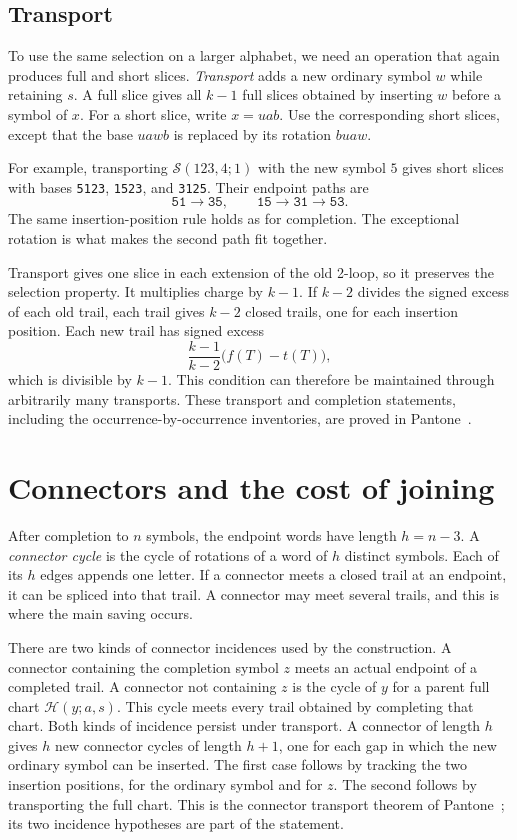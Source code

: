 \documentclass[11pt]{article}
\newcommand{\Slice}{\mathcal S}
\newcommand{\Chart}{\mathcal H}
\newcommand{\word}[1]{\texttt{#1}}
\begin{document}
\subsection{Transport}

To use the same selection on a larger alphabet, we need an operation
that again produces full and short slices. \emph{Transport} adds a new
ordinary symbol $w$ while retaining $s$. A full slice gives all $k-1$
full slices obtained by inserting $w$ before a symbol of $x$. For a short
slice, write $x=uab$. Use the corresponding short slices, except that
the base $uawb$ is replaced by its rotation $buaw$.

For example, transporting $\Slice(123,4;1)$ with the new symbol $5$
gives short slices with bases \word{5123}, \word{1523}, and \word{3125}.
Their endpoint paths are
\[
 \word{51}\longrightarrow\word{35},\qquad
 \word{15}\longrightarrow\word{31}\longrightarrow\word{53}.
\]
The same insertion-position rule holds as for completion. The exceptional
rotation is what makes the second path fit together.

Transport gives one slice in each extension of the old 2-loop, so it
preserves the selection property. It multiplies charge by $k-1$.
If $k-2$ divides the signed excess of each old trail, each trail gives
$k-2$ closed trails, one for each insertion position. Each new trail has
signed excess
\begin{equation}\label{eq-excess}
 \frac{k-1}{k-2}\bigl(f(T)-t(T)\bigr),
\end{equation}
which is divisible by $k-1$. This condition can therefore be maintained
through arbitrarily many transports. These transport and completion
statements, including the occurrence-by-occurrence inventories, are
proved in Pantone~\cite{pantone}.

\section{Connectors and the cost of joining}\label{sec-join}

After completion to $n$ symbols, the endpoint words have length
$h=n-3$. A \emph{connector cycle} is the cycle of rotations of a word
of $h$ distinct symbols. Each of its $h$ edges appends one letter. If
a connector meets a closed trail at an endpoint, it can be spliced into
that trail. A connector may meet several trails, and this is where the
main saving occurs.

There are two kinds of connector incidences used by the construction.
A connector containing the completion symbol $z$ meets an actual endpoint
of a completed trail. A connector not containing $z$ is the cycle of
$y$ for a parent full chart $\Chart(y;a,s)$. This cycle meets every trail
obtained by completing that chart. Both kinds of incidence persist under
transport. A connector of length $h$ gives $h$ new connector cycles of
length $h+1$, one for each gap in which the new ordinary symbol can be
inserted. The first case follows by tracking the two insertion positions,
for the ordinary symbol and for $z$. The second follows by transporting
the full chart. This is the connector transport theorem of
Pantone~\cite{pantone}; its two incidence hypotheses are part of the
statement.
\end{document}
